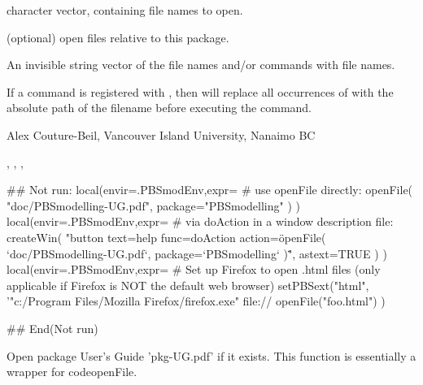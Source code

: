 \documentclass[letterpaper]{book}
\begin{document}
%
\begin{Arguments}
\begin{ldescription}
\item[\code{fname}] character vector, containing file names to open.
\item[\code{package}] (optional) open files relative to this package.
\end{ldescription}
\end{Arguments}
%
\begin{Value}
An invisible string vector of the file names and/or commands with file names.
\end{Value}
%
\begin{Note}\relax
If a command is registered with , then 
 will replace all occurrences of  
with the absolute path of the filename before executing the command.
\end{Note}
%
\begin{Author}\relax
Alex Couture-Beil, Vancouver Island University, Nanaimo BC
\end{Author}
%
\begin{SeeAlso}\relax
{}, , ,
\end{SeeAlso}
%
\begin{Examples}
\begin{ExampleCode}
## Not run: 
local(envir=.PBSmodEnv,expr={
  # use openFile directly:
  openFile( "doc/PBSmodelling-UG.pdf", package="PBSmodelling" )
})
local(envir=.PBSmodEnv,expr={
  # via doAction in a window description file:
  createWin( "button text=help func=doAction action=\"openFile( `doc/PBSmodelling-UG.pdf`, package=`PBSmodelling` )\"", astext=TRUE )
})
local(envir=.PBSmodEnv,expr={
  # Set up Firefox to open .html files (only applicable if Firefox is NOT the default web browser)
  setPBSext("html", '"c:/Program Files/Mozilla Firefox/firefox.exe" file://%
  openFile("foo.html")
})

## End(Not run)
\end{ExampleCode}
\end{Examples}
%
\begin{Description}\relax
Open package User's Guide 'pkg-UG.pdf' if it exists.
This function is essentially a wrapper for codeopenFile.
\end{Description}
\end{document}
